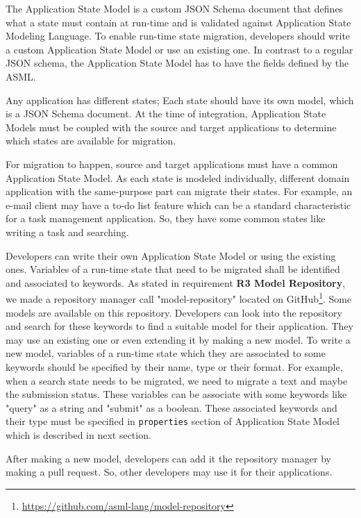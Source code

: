 
The Application State Model is a custom JSON Schema document that defines what a state must contain at run-time and is validated against Application State Modeling Language. To enable run-time state migration, developers should write a custom Application State Model or use an existing one. In contrast to a regular JSON schema, the Application State Model has to have the fields defined by the ASML.

Any application has different states; Each state should have its own model, which is a JSON Schema document. At the time of integration, Application State Models must be coupled with the source and target applications to determine which states are available for migration.

For migration to happen, source and target applications must have a common Application State Model. As each state is modeled individually, different domain application with the same-purpose part can migrate their states. For example, an e-mail client may have a to-do list feature which can be a standard characteristic for a task management application. So, they have some common states like writing a task and searching.

Developers can write their own Application State Model or using the existing ones. Variables of a run-time state that need to be migrated shall be identified and associated to keywords. As stated in requirement \textbf{R3 Model Repository}, we made a repository manager call "model-repository" located on GitHub\footnote{\url{https://github.com/asml-lang/model-repository}}. Some models are available on this repository. Developers can look into the repository and search for these keywords to find a suitable model for their application. They may use an existing one or even extending it by making a new model. To write a new model, variables of a run-time state which they are associated to some keywords should be specified by their name, type or their format. For example, when a search state needs to be migrated, we need to migrate a text and maybe the submission status. These variables can be associate with some keywords like "query" as a string and "submit" as a boolean. These associated keywords and their type must be specified in \lstinline[basicstyle=\ttfamily]{properties} section of Application State Model which is described in next section. 

After making a new model, developers can add it the repository manager by making a pull request. So, other developers may use it for their applications.

